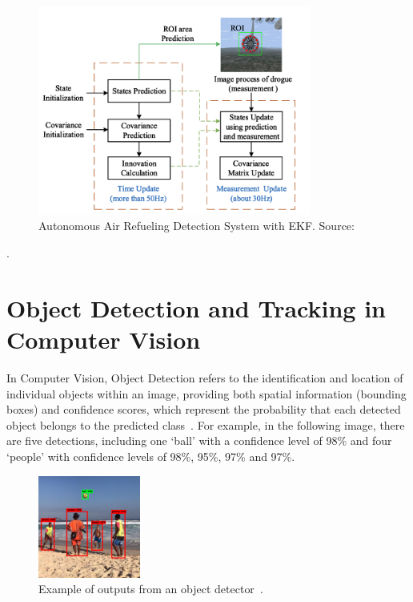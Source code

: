 \documentclass[12pt,oneside]{book} %
\begin{document}
\begin{figure}[H]
    \centering
    \includegraphics[width=0.8\textwidth]{figures/detection_system_AAREKF.png}
    \caption{Autonomous Air Refueling Detection System with EKF. Source: \citet{AAREKF}}\label{fig:detection-system-aarekf}
\end{figure}
.

\newpage
\section{Object Detection and Tracking in Computer Vision}
In Computer Vision, Object Detection refers to the identification and location
of individual objects within an image, providing both spatial information
(bounding boxes) and confidence scores, which represent the probability that
each detected object belongs to the predicted
class~\cite{huggingface2023objectdetection}. For example, in the following
image, there are five detections, including one `ball' with a confidence level
of 98\% and four `people' with confidence levels of 98\%, 95\%, 97\% and 97\%.

\begin{figure}[H]
    \centering
    \includegraphics[width=0.3\textwidth]{figures/intro_object_detection.png}
    \caption{Example of outputs from an object detector~\cite{huggingface2023objectdetection}.}\label{fig:object-detection}
\end{figure}
\end{document}
